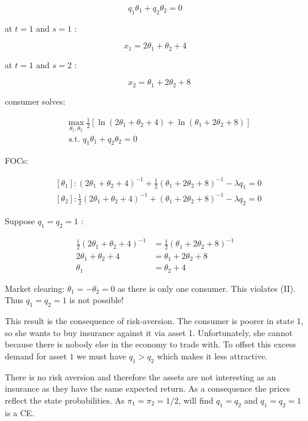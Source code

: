 {{\begin{enumerate}[label=(\roman*)]
{$$
q_{1} \theta_{1}+q_{2} \theta_{2}=0
$$

at $t=1$ and $s=1$ :

$$
x_{1}=2 \theta_{1}+\theta_{2}+4
$$

at $t=1$ and $s=2$ : 

$$
\quad x_{2}=\theta_{1}+2 \theta_{2}+8
$$
}
{\item 
consumer solves:

$$
\begin{aligned}
& \max _{\theta_{1}, \theta_{2}} \frac{1}{2}\left[\ln \left(2 \theta_{1}+\theta_{2}+4\right)+\ln \left(\theta_{1}+2 \theta_{2}+8\right)\right] \\
& \text { s.t. } q_{1} \theta_{1}+q_{2} \theta_{2}=0
\end{aligned}
$$

FOCs:

$$
\begin{aligned}
& \left[\theta_{1}\right]:\left(2 \theta_{1}+\theta_{2}+4\right)^{-1}+\frac{1}{2}\left(\theta_{1}+2 \theta_{2}+8\right)^{-1}-\lambda q_{1}=0 \\
& \left[\theta_{2}\right]: \frac{1}{2}\left(2 \theta_{1}+\theta_{2}+4\right)^{-1}+\left(\theta_{1}+2 \theta_{2}+8\right)^{-1}-\lambda q_{2}=0
\end{aligned}
$$

Suppose $q_{1}=q_{2}=1$ :

\begin{align*}
\frac{1}{2}\left(2 \theta_{1}+\theta_{2}+4\right)^{-1} & =\frac{1}{2}\left(\theta_{1}+2 \theta_{2}+8\right)^{-1} \\
2 \theta_{1}+\theta_{2}+4 & =\theta_{1}+2 \theta_{2}+8 \\
\theta_{1} & =\theta_{2}+4 \tag{II}
\end{align*}

Market clearing: $\theta_{1}=-\theta_{2}=0$ as there is only one consumer. This violates (II). Thus $q_{1}=q_{2}=1$ is not possible!

This result is the consequence of risk-aversion. The consumer is poorer in state 1, so she wants to buy insurance against it via asset 1. Unfortunately, she cannot because there is nobody else in the economy to trade with. To offset this excess demand for asset $1$ we must have $q_{1}>q_{2}$ which makes it less attractive.
}
{\item 
There is no risk aversion and therefore the assets are not interesting as an insurance as they have the same expected return. As a consequence the prices reflect the state probabilities. As $\pi_{1}=\pi_{2}=1 / 2$, will find $q_{1}=q_{2}$ and $q_{1}=q_{2}=1$ is a CE.
}
\end{enumerate}
}
}